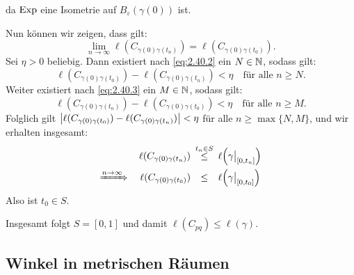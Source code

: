 \begin{beweis}
\begin{itemize}
		da $\operatorname{Exp}$ eine Isometrie auf $B_\varepsilon(\gamma(0))$ ist.
		
		Nun können wir zeigen, dass gilt:
		\[
			\lim\limits_{n \rightarrow \infty} \ell(C_{\gamma(0)\gamma(t_n)}) = \ell(C_{\gamma(0)\gamma(t_0)}).
		\]
		Sei $\eta > 0$ beliebig.
		Dann existiert nach \eqref{eq:2.40.2} ein $N \in \mathbb{N}$, sodass gilt:
		\[
			\ell(C_{\gamma(0)\gamma(t_0)}) - \ell(C_{\gamma(0)\gamma(t_n)}) < \eta \quad \text{für alle } n \geq N.
		\]
		Weiter existiert nach \eqref{eq:2.40.3} ein $M \in \mathbb{N}$, sodass gilt:
		\[
			\ell(C_{\gamma(0)\gamma(t_n)}) - \ell(C_{\gamma(0)\gamma(t_0)}) < \eta \quad \text{für alle } n \geq M.
		\]		
		Folglich gilt $\left\lvert\ell(C_{\gamma(0)\gamma(t_0)}) - \ell(C_{\gamma(0)\gamma(t_n)})\right\rvert < \eta$ für alle $n \geq \max\{N,M\}$, und wir erhalten insgesamt:
		\begin{align*}
			\ell(C_{\gamma(0)\gamma(t_n)}) &\stack{t_n \in S}{\leq} \ell\enbrace*{\gamma \big|_{[0,t_n]}} \\
			\xRightarrow{n \rightarrow \infty} \quad \ell(C_{\gamma(0)\gamma(t_0)}) &\stack{}{\leq} \ell\enbrace*{\gamma \big|_{[0,t_0]}}
		\end{align*}
		Also ist $t_0 \in S$.
	\end{itemize}
	Insgesamt folgt $S = [0,1]$ und damit $\ell(C_{pq}) \leq \ell(\gamma)$. 
\end{beweis}

\subsection{Winkel in metrischen Räumen}
\label{sec:2.4}

